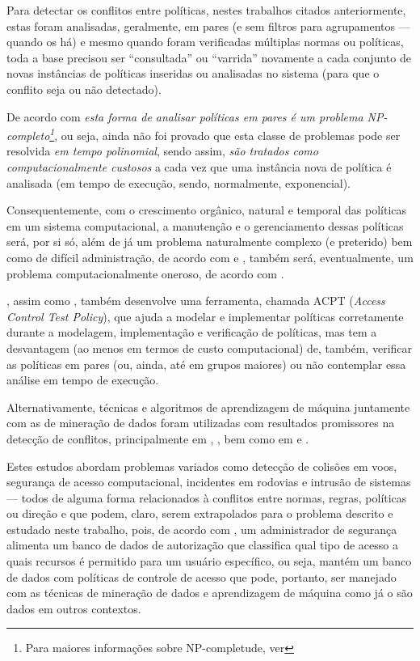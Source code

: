 \documentclass[
	12pt,				%
	openright,			%
	oneside,			%
	a4paper,			%
	english,			%
	french,				%
	spanish,			%
	brazil				%
	]{abntex2}
\begin{document}
Para detectar os conflitos entre políticas, nestes trabalhos citados anteriormente, estas foram analisadas, geralmente, em pares (e sem filtros para agrupamentos — quando os há) e mesmo quando foram verificadas múltiplas normas ou políticas, toda a base precisou ser “consultada” ou “varrida” novamente a cada conjunto de novas instâncias de políticas inseridas ou analisadas no sistema (para que o conflito seja ou não detectado).

De acordo com  \textit{esta forma de analisar políticas em pares é um problema NP-completo\footnote{Para maiores informações sobre NP-completude, ver }}, ou seja, ainda não foi provado que esta classe de problemas pode ser resolvida \textit{em tempo polinomial}, sendo assim, \textit{são tratados como computacionalmente custosos} a cada vez que uma instância nova de política é analisada (em tempo de execução, sendo, normalmente, exponencial). 

Consequentemente, com o crescimento orgânico, natural e temporal das políticas em um sistema computacional, a manutenção e o gerenciamento dessas políticas será, por si só, além de já um problema naturalmente complexo (e preterido) bem como de difícil administração, de acordo com  e , também será, eventualmente, um problema computacionalmente oneroso, de acordo com .

, assim como , também desenvolve uma ferramenta, chamada ACPT (\textit{Access Control Test Policy}), que ajuda a modelar e implementar políticas corretamente durante a modelagem, implementação e verificação de políticas, mas tem a desvantagem (ao menos em termos de custo computacional) de, também, verificar as políticas em pares (ou, ainda, até em grupos maiores) ou não contemplar essa análise em tempo de execução.

Alternativamente, técnicas e algoritmos de aprendizagem de máquina juntamente com as de mineração de dados foram utilizadas com resultados promissores na detecção de conflitos, principalmente em , , bem como em  e . 

Estes estudos abordam problemas variados como detecção de colisões em voos, segurança de acesso computacional, incidentes em rodovias e intrusão de sistemas — todos de alguma forma relacionados à conflitos entre normas, regras, políticas ou direção e que podem, claro, serem extrapolados para o problema descrito e estudado neste trabalho, pois, de acordo com , um administrador de segurança alimenta um banco de dados de autorização que classifica qual tipo de acesso a quais recursos é permitido para um usuário específico, ou seja, mantém um banco de dados com políticas de controle de acesso que pode, portanto, ser manejado com as técnicas de mineração de dados e aprendizagem de máquina como já o são dados em outros contextos.
\end{document}

